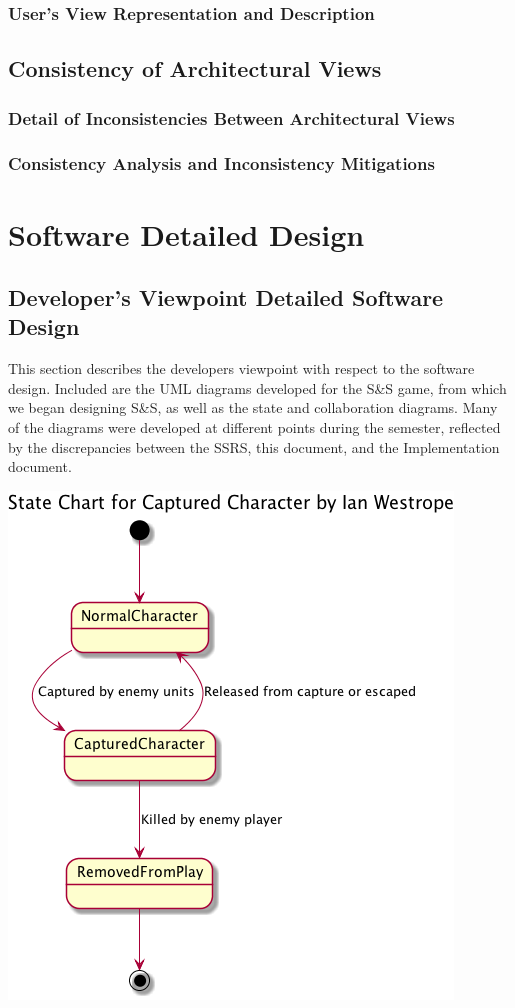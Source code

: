 \documentclass[12pt,a4paper,titlepage]{article}
\begin{document}
	\subsubsection{User's View Representation and Description}
	
	
\subsection{Consistency of Architectural Views}
	\subsubsection{Detail of Inconsistencies Between Architectural Views}
	\subsubsection{Consistency Analysis and Inconsistency Mitigations}

\section{Software Detailed Design}
\subsection{Developer's Viewpoint Detailed Software Design}
This section describes the developers viewpoint with respect to the software design. Included are the UML diagrams developed for the S\&S game, from which we began designing S\&S, as well as the state and collaboration diagrams. Many of the diagrams were developed at different points during the semester, reflected by the discrepancies between the SSRS, this document, and the Implementation document. 





\includegraphics{CharacterCapture}


\pagebreak
\end{document}
